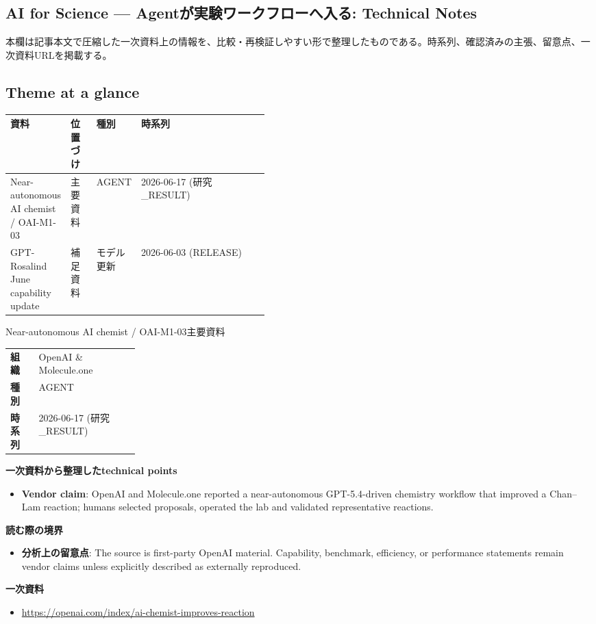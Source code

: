 \subsection*{AI for Science — Agentが実験ワークフローへ入る: Technical Notes}
本欄は記事本文で圧縮した一次資料上の情報を、比較・再検証しやすい形で整理したものである。時系列、確認済みの主張、留意点、一次資料URLを掲載する。
\medskip
\subsection*{Theme at a glance}
\begin{center}
\footnotesize
\begin{tabularx}{\linewidth}{@{}p{0.20\linewidth}p{0.10\linewidth}p{0.14\linewidth}X@{}}
\toprule
資料 & 位置づけ & 種別 & 時系列 \\
\midrule
Near-autonomous AI chemist / OAI-M1-03 & 主要資料 & AGENT & 2026-06-17 (研究\_RESULT) \\
GPT-Rosalind June capability update & 補足資料 & モデル更新 & 2026-06-03 (RELEASE) \\
\bottomrule
\end{tabularx}
\end{center}
\normalsize

\begin{technicalnote}{Near-autonomous AI chemist / OAI-M1-03}{主要資料}
\begin{tabularx}{\linewidth}{@{}>{\bfseries}p{0.22\linewidth}X@{}}
組織 & OpenAI \& Molecule.one \\
種別 & AGENT \\
時系列 & 2026-06-17 (研究\_RESULT) \\
\end{tabularx}
\smallskip
{\bfseries 一次資料から整理したtechnical points}
\begin{itemize}[leftmargin=1.5em,itemsep=0.35em]
\item \textbf{Vendor claim}: OpenAI and Molecule.one reported a near-autonomous GPT-5.4-driven chemistry workflow that improved a Chan–Lam reaction; humans selected proposals, operated the lab and validated representative reactions.
\end{itemize}
{\bfseries 読む際の境界}
\begin{itemize}[leftmargin=1.5em,itemsep=0.35em]
\item \textbf{分析上の留意点}: The source is first-party OpenAI material. Capability, benchmark, efficiency, or performance statements remain vendor claims unless explicitly described as externally reproduced.
\end{itemize}
{\bfseries 一次資料}
\begingroup\sloppy
\begin{itemize}[leftmargin=1.5em,itemsep=0.25em]
\item {\scriptsize\url{https://openai.com/index/ai-chemist-improves-reaction}}
\end{itemize}
\endgroup
\end{technicalnote}
\medskip

